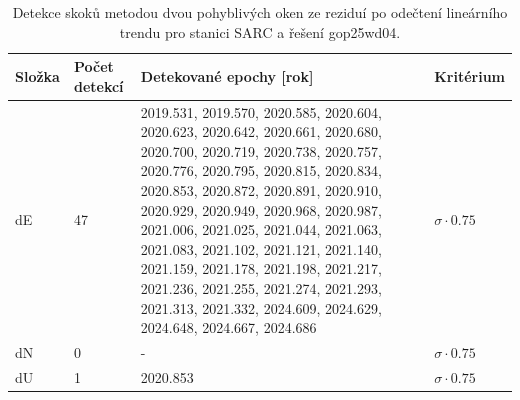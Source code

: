 \begin{table}[htbp]
\caption{Detekce skoků metodou dvou pohyblivých oken ze reziduí po odečtení lineárního trendu pro stanici SARC a řešení gop25wd04.}
\label{tab:gop25wd04_stcd_sarc_detr_weighted_1seg_jumps_sliding_window}
\begin{tabular}{llll}
\toprule
Složka & Počet detekcí & Detekované epochy [rok] & Kritérium \\
\midrule
dE & 47 & 2019.531, 2019.570, 2020.585, 2020.604, 2020.623, 2020.642, 2020.661, 2020.680, 2020.700, 2020.719, 2020.738, 2020.757, 2020.776, 2020.795, 2020.815, 2020.834, 2020.853, 2020.872, 2020.891, 2020.910, 2020.929, 2020.949, 2020.968, 2020.987, 2021.006, 2021.025, 2021.044, 2021.063, 2021.083, 2021.102, 2021.121, 2021.140, 2021.159, 2021.178, 2021.198, 2021.217, 2021.236, 2021.255, 2021.274, 2021.293, 2021.313, 2021.332, 2024.609, 2024.629, 2024.648, 2024.667, 2024.686 & $\sigma \cdot 0.75$ \\
dN & 0 & - & $\sigma \cdot 0.75$ \\
dU & 1 & 2020.853 & $\sigma \cdot 0.75$ \\
\bottomrule
\end{tabular}
\end{table}
